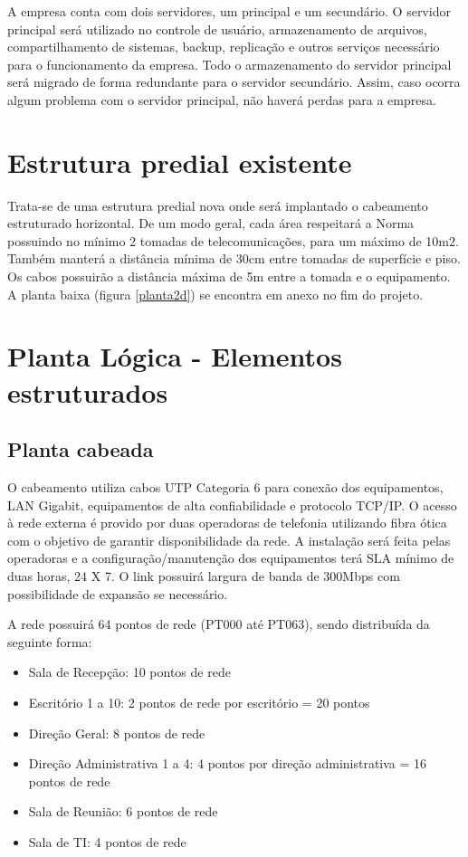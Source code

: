 \documentclass[	DIV=calc,%
							paper=a4,%
							fontsize=12pt,%
							onecolumn]{scrartcl}	 					%
\begin{document}
A empresa conta com dois servidores, um principal e um secundário. O servidor principal será utilizado no controle de usuário, armazenamento de arquivos, compartilhamento de sistemas, backup, replicação e outros serviços necessário para o funcionamento da empresa. Todo o armazenamento do servidor principal será migrado de forma redundante para o servidor secundário. Assim, caso ocorra algum problema com o servidor principal, não haverá perdas para a empresa.


\section{Estrutura predial existente}

Trata-se de uma estrutura predial nova onde será implantado o cabeamento estruturado horizontal. De um modo geral, cada área respeitará a Norma possuindo no mínimo 2 tomadas de telecomunicações, para um máximo de 10m2. Também manterá a distância mínima de 30cm entre tomadas de superfície e piso. Os cabos possuirão a distância máxima de 5m entre a tomada e o equipamento. A planta baixa (figura \ref{planta2d}) se encontra em anexo no fim do projeto. 


\section{Planta Lógica - Elementos estruturados}

\subsection{Planta cabeada}

O cabeamento utiliza cabos UTP Categoria 6 para conexão dos equipamentos, LAN Gigabit, equipamentos de alta confiabilidade e protocolo TCP/IP. O acesso à rede externa é provido por duas operadoras de telefonia utilizando fibra ótica com o objetivo de garantir disponibilidade da rede. A instalação será feita pelas operadoras e a configuração/manutenção dos equipamentos terá SLA mínimo de duas horas, 24 X 7. O link possuirá largura de banda de 300Mbps com possibilidade de expansão se necessário. 

A rede possuirá 64 pontos de rede (PT000 até PT063), sendo distribuída da seguinte forma:

\begin{itemize}
\item Sala de Recepção: 10 pontos de rede
\item Escritório 1 a 10: 2 pontos de rede por escritório = 20 pontos
\item Direção Geral: 8 pontos de rede
\item Direção Administrativa 1 a 4: 4 pontos por direção administrativa = 16 pontos de rede
\item Sala de Reunião: 6 pontos de rede
\item Sala de TI: 4 pontos de rede
\end{itemize}
\end{document}
